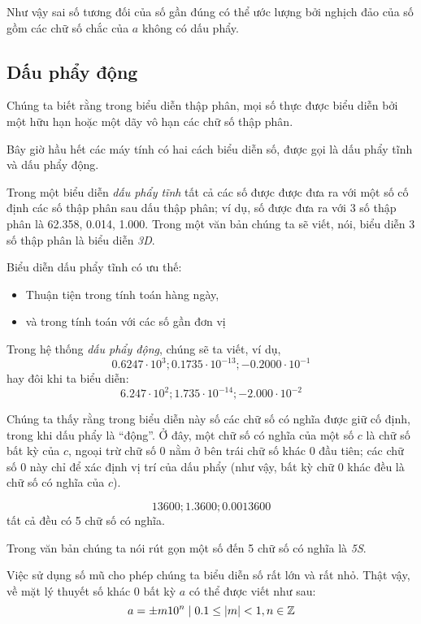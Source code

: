 \documentclass[../../Lectures.tex]{subfiles}
\begin{document}
Như vậy sai số tương đối của số gần đúng có thể ước lượng bởi nghịch đảo của số
gồm các chữ số chắc của \(a\) không có dấu phẩy.

\subsection{Dấu phẩy động}

Chúng ta biết rằng trong biểu diễn thập phân, mọi số thực được biểu diễn bởi một
hữu hạn hoặc một dãy vô hạn các chữ số thập phân.

Bây giờ hầu hết các máy tính có hai cách biểu diễn số, được gọi là dấu phẩy tĩnh
và dấu phẩy động.

Trong một biểu diễn \emph{dấu phẩy tĩnh} tất cả các số được được đưa ra với một
số cố định các số thập phân sau dấu thập phân; ví dụ, số được đưa ra với 3 số
thập phân là \num{62.358}, \num{0.014}, \num{1.000}. Trong một văn bản chúng ta
sẽ viết, nói, biểu diễn 3 số thập phân là biểu diễn \emph{3D}.

Biểu diễn dấu phẩy tĩnh có ưu thế:
\begin{itemize}
    \item Thuận tiện trong tính toán hàng ngày,
    \item và trong tính toán với các số gần đơn vị
\end{itemize}

Trong hệ thống \emph{dấu phẩy động}, chúng sẽ ta viết, ví dụ,
\[\num{0.6247} \cdot 10^3; \num{0.1735} \cdot 10^{-13}; \num{-0.2000} \cdot 10^{-1}\]
hay đôi khi ta biểu diễn:
\[\num{6.247} \cdot 10^2; \num{1.735} \cdot 10^{-14}; \num{-2.000} \cdot 10^{-2}\]

Chúng ta thấy rằng trong biểu diễn này số các chữ số có nghĩa được giữ cố định,
trong khi dấu phẩy là ``động''. Ở đây, một chữ số có nghĩa của một số \(c\) là
chữ số bất kỳ của \(c\), ngoại trừ chữ số \(0\) nằm ở bên trái chữ số khác \(0\)
đầu tiên; các chữ số \(0\) này chỉ để xác định vị trí của dấu phẩy (như vậy, bất
kỳ chữ \(0\) khác đều là chữ số có nghĩa của \(c\)).

\begin{exmp}
    \[\num{13600}; \num{1.3600}; \num{0.0013600}\]
    tất cả đều có 5 chữ số có nghĩa.
\end{exmp}

Trong văn bản chúng ta nói rút gọn một số đến 5 chữ số có nghĩa là \emph{5S}.

Việc sử dụng số mũ cho phép chúng ta biểu diễn số rất lớn và rất nhỏ. Thật vậy,
về mặt lý thuyết số khác 0 bất kỳ \(a\) có thể được viết như sau:
\[a = \pm m 10^n \mid 0.1 \leq \lvert m\rvert < 1, n \in \mathbb{Z}\]
\end{document}
